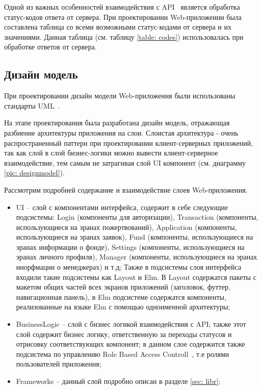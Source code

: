 \documentclass[a4paper,12pt,reqno]{article}
\begin{document}
Одной из важных особенностей взаимодействия с API~\cite{api} является обработка статус-кодов ответа от сервера. При проектировании Web-приложении была составлена таблица со всеми возможными статус-кодами от сервера и их значениями. Данная таблица (см. таблицу \ref{table: codes}) использовалась при обработке ответов от сервера.



\subsection{Дизайн модель}

При проектировании дизайн модели Web-приложения были использованы стандарты UML~\cite{uml}. 

На этапе проектирования была разработана дизайн модель, отражающая разбиение архитектуры приложения на слои. Слоистая архитектура - очень распространенный паттерн при проектировании клиент-серверных приложений, так как слой в слой бизнес-логики можно вывести клиент-серверное взаимодействие, тем самым не затрагивая слой UI компонент (см. диаграмму \ref{pic: designmodel}).

Рассмотрим подробней содержание и взаимодействие слоев Web-приложения. 

\begin{itemize}
    \item UI -- слой с компонентами интерфейса, содержит в себе следующие подсистемы: Login (компоненты для авторизации), Transaction (компоненты, использующиеся на эранах пожертвований), Application (компоненты, использующиеся на эранах заявок), Fund (компоненты, использующиеся на эранах информации о фонде), Settings (компоненты, использующиеся на эранах личного профиля), Manager (компоненты, использующиеся на эранах инорфмации о менеджерах) и т.д; Также в подсистемы слоя интерфейса входили такие подсистемы как Layout и Elm. В Layout содержатся пакеты с макетом общих частей всех экранов приложений (заголовок, футтер, навигационная панель), в Elm подсистеме содержатся компоненты, реализованные на языке Elm с помощью одноименной архитектуры;
    \item BusinessLogic -- слой с бизнес логикой взаимодействия с API; также этот слой содержит бизнес логику, ответственную за переходы статусов и отрисовку соответствующих компонент; в данном слое содержится также подсистема по управлению Role Based Access Controll~\cite{rbac}, т.е ролями пользователей приложения;
    \item Frameworks -- данный слой подробно описан в разделе \ref{sec: libr};
\end{itemize}
\end{document}

